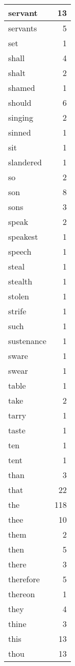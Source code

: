 \begin{center}
\begin{longtable}{l|r}
servant & 13 \\ \hline
servants & 5 \\ \hline
set & 1 \\ \hline
shall & 4 \\ \hline
shalt & 2 \\ \hline
shamed & 1 \\ \hline
should & 6 \\ \hline
singing & 2 \\ \hline
sinned & 1 \\ \hline
sit & 1 \\ \hline
slandered & 1 \\ \hline
so & 2 \\ \hline
son & 8 \\ \hline
sons & 3 \\ \hline
speak & 2 \\ \hline
speakest & 1 \\ \hline
speech & 1 \\ \hline
steal & 1 \\ \hline
stealth & 1 \\ \hline
stolen & 1 \\ \hline
strife & 1 \\ \hline
such & 1 \\ \hline
sustenance & 1 \\ \hline
sware & 1 \\ \hline
swear & 1 \\ \hline
table & 1 \\ \hline
take & 2 \\ \hline
tarry & 1 \\ \hline
taste & 1 \\ \hline
ten & 1 \\ \hline
tent & 1 \\ \hline
than & 3 \\ \hline
that & 22 \\ \hline
the & 118 \\ \hline
thee & 10 \\ \hline
them & 2 \\ \hline
then & 5 \\ \hline
there & 3 \\ \hline
therefore & 5 \\ \hline
thereon & 1 \\ \hline
they & 4 \\ \hline
thine & 3 \\ \hline
this & 13 \\ \hline
thou & 13 \\ \hline

\end{longtable}
\end{center}
